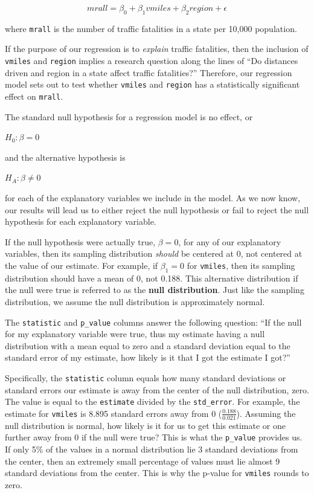 \documentclass[
]{book}
\begin{document}
\begin{equation}
mrall = \beta_0 + \beta_1vmiles + \beta_2region + \epsilon
\label{eq:exmodel}
\end{equation}

where \texttt{mrall} is the number of traffic fatalities in a state per 10,000 population.

If the purpose of our regression is to \emph{explain} traffic fatalities, then the inclusion of \texttt{vmiles} and \texttt{region} implies a research question along the lines of ``Do distances driven and region in a state affect traffic fatalities?'' Therefore, our regression model sets out to test whether \texttt{vmiles} and \texttt{region} has a statistically significant effect on \texttt{mrall}.

The standard null hypothesis for a regression model is no effect, or

\(H_0: \beta=0\)

and the alternative hypothesis is

\(H_A: \beta \neq 0\)

for each of the explanatory variables we include in the model. As we now know, our results will lead us to either reject the null hypothesis or fail to reject the null hypothesis for each explanatory variable.

If the null hypothesis were actually true, \(\beta=0\), for any of our explanatory variables, then its sampling distribution \emph{should} be centered at 0, not centered at the value of our estimate. For example, if \(\beta_1=0\) for \texttt{vmiles}, then its sampling distribution should have a mean of 0, not 0.188. This alternative distribution if the null were true is referred to as the \textbf{null distribution}. Just like the sampling distribution, we assume the null distribution is approximately normal.

The \texttt{statistic} and \texttt{p\_value} columns answer the following question: ``If the null for my explanatory variable were true, thus my estimate having a null distribution with a mean equal to zero and a standard deviation equal to the standard error of my estimate, how likely is it that I got the estimate I got?''

Specifically, the \texttt{statistic} column equals how many standard deviations or standard errors our estimate is away from the center of the null distribution, zero. The value is equal to the \texttt{estimate} divided by the \texttt{std\_error}. For example, the estimate for \texttt{vmiles} is 8.895 standard errors away from 0 (\(\frac {0.188}{0.021}\)). Assuming the null distribution is normal, how likely is it for us to get this estimate or one further away from 0 if the null were true? This is what the \texttt{p\_value} provides us. If only 5\% of the values in a normal distribution lie 3 standard deviations from the center, then an extremely small percentage of values must lie almost 9 standard deviations from the center. This is why the p-value for \texttt{vmiles} rounds to zero.
\end{document}
